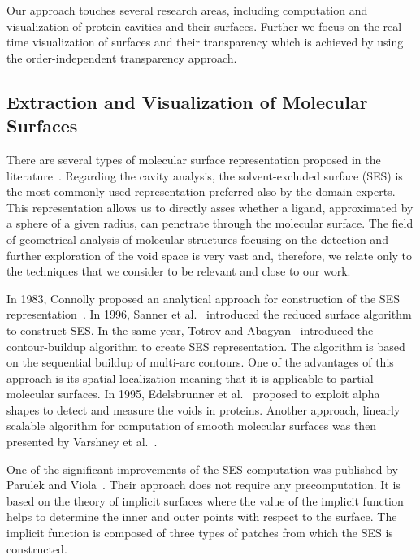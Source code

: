 Our approach touches several research areas, including computation and visualization of protein cavities and their surfaces. 
Further we focus on the real-time visualization of surfaces and their transparency which is achieved by using the order-independent transparency approach. 

\subsection{Extraction and Visualization of Molecular Surfaces}
There are several types of molecular surface representation proposed in the literature~\cite{STAR2015}. 
Regarding the cavity analysis, the solvent-excluded surface (SES) is the most commonly used representation preferred also by the domain experts.
This representation allows us to directly asses whether a ligand, approximated by a sphere of a given radius, can penetrate through the molecular surface. 
The field of geometrical analysis of molecular structures focusing on the detection and further exploration of the void space is very vast and, therefore, we relate only to the techniques that we consider to be relevant and close to our work. 

In 1983, Connolly proposed an analytical approach for construction of the SES representation~\cite{connolly1983analytical}.
In 1996, Sanner et al.~\cite{Sanner1996} introduced the reduced surface algorithm to construct SES. In the same year, Totrov and Abagyan~\cite{totrov1996contour} introduced the contour-buildup algorithm to create SES representation. The algorithm is based on the sequential buildup of multi-arc contours. 
One of the advantages of this approach is its spatial localization meaning that it is applicable to partial molecular surfaces.
In 1995, Edelsbrunner et al.~\cite{Edelsbrunner1995} proposed to exploit alpha shapes to detect and measure the voids in proteins.
Another approach, linearly scalable algorithm for computation of smooth molecular surfaces was then presented by Varshney et al.~\cite{Varshney1994}.

One of the significant improvements of the SES computation was published by Parulek and Viola~\cite{parulek2012implicit}.
Their approach does not require any precomputation. 
It is based on the theory of implicit surfaces where the value of the implicit function helps to determine the inner and outer points with respect to the surface.
The implicit function is composed of three types of patches from which the SES is constructed.

